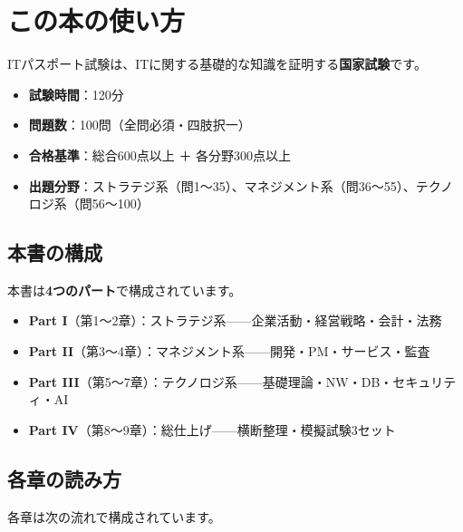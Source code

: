 \chapter*{この本の使い方}

\begin{teigi}[ITパスポート試験とは]
ITパスポート試験は、ITに関する基礎的な知識を証明する\textbf{国家試験}です。

\begin{itemize}
  \item \textbf{試験時間}：120分
  \item \textbf{問題数}：100問（全問必須・四肢択一）
  \item \textbf{合格基準}：総合600点以上 ＋ 各分野300点以上
  \item \textbf{出題分野}：ストラテジ系（問1〜35）、マネジメント系（問36〜55）、テクノロジ系（問56〜100）
\end{itemize}
\end{teigi}

\section*{本書の構成}

本書は\textbf{4つのパート}で構成されています。

\begin{hikaku}[4パート構成]
\begin{itemize}
  \item \textbf{Part I}（第1〜2章）：ストラテジ系——企業活動・経営戦略・会計・法務
  \item \textbf{Part II}（第3〜4章）：マネジメント系——開発・PM・サービス・監査
  \item \textbf{Part III}（第5〜7章）：テクノロジ系——基礎理論・NW・DB・セキュリティ・AI
  \item \textbf{Part IV}（第8〜9章）：総仕上げ——横断整理・模擬試験3セット
\end{itemize}
\end{hikaku}

\section*{各章の読み方}

各章は次の流れで構成されています。

